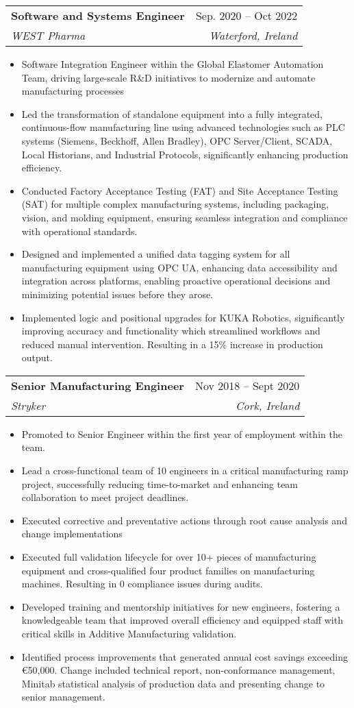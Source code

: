 \documentclass[letterpaper,11pt]{article}
\makeatletter
\newcommand{\resumeItem}[1]{
  \item\small{
    {#1 \vspace{-2pt}}
  }
}
\newcommand{\resumeSubheading}[4]{
  \vspace{-2pt}\item
    \begin{tabular*}{0.97\textwidth}[t]{l@{\extracolsep{\fill}}r}
      \textbf{#1} & #2 \\
      \textit{\small#3} & \textit{\small #4} \\
    \end{tabular*}\vspace{-7pt}
}
\newcommand{\resumeSubHeadingListEnd}{\end{itemize}}
\newcommand{\resumeItemListStart}{\begin{itemize}}
\newcommand{\resumeItemListEnd}{\end{itemize}\vspace{-5pt}}
\makeatother
\begin{document}
    \resumeSubheading
      {Software and Systems Engineer}{Sep. 2020 -- Oct 2022}
      {WEST Pharma}{Waterford, Ireland}
      \resumeItemListStart
        \resumeItem{Software Integration Engineer within the Global Elastomer Automation Team, driving large-scale R\&D initiatives to modernize and automate manufacturing processes}
        \resumeItem{Led the transformation of standalone equipment into a fully integrated, continuous-flow manufacturing line using advanced technologies such as PLC systems (Siemens, Beckhoff, Allen Bradley), OPC Server/Client, SCADA, Local Historians, and Industrial Protocols, significantly enhancing production efficiency.}
        \resumeItem{Conducted Factory Acceptance Testing (FAT) and Site Acceptance Testing (SAT) for multiple complex manufacturing systems, including packaging, vision, and molding equipment, ensuring seamless integration and compliance with operational standards.}
        \resumeItem{Designed and implemented a unified data tagging system for all manufacturing equipment using OPC UA, enhancing data accessibility and integration across platforms, enabling proactive operational decisions and minimizing potential issues before they arose.}
        \resumeItem{Implemented logic and positional upgrades for KUKA Robotics, significantly improving accuracy and functionality which streamlined workflows and reduced manual intervention. Resulting in a 15\% increase in production output.} \linebreak[4]
        \linebreak[4]
        
    \resumeItemListEnd
    
    \resumeSubheading
      {Senior Manufacturing Engineer}{Nov 2018 -- Sept 2020}
      {Stryker}{Cork, Ireland}
      \resumeItemListStart
      \resumeItem{Promoted to Senior Engineer within the first year of employment within the team.}
        \resumeItem{Lead a cross-functional team of 10 engineers in a critical manufacturing ramp project, successfully reducing time-to-market and enhancing team collaboration to meet project deadlines.}
        \resumeItem{Executed corrective and preventative actions through root cause analysis and change implementations}
        \resumeItem{Executed full validation lifecycle for over 10+ pieces of manufacturing equipment and cross-qualified four product families on manufacturing machines. Resulting in 0 compliance issues during audits.}
        \resumeItem{Developed training and mentorship initiatives for new engineers, fostering a knowledgeable team that improved overall efficiency and equipped staff with critical skills in Additive Manufacturing validation.}
        \resumeItem{Identified process improvements that generated annual cost savings exceeding €50,000.
        Change included technical report, non-conformance management, Minitab statistical analysis of production data and presenting change to senior management.}
  \resumeSubHeadingListEnd
\end{document}
